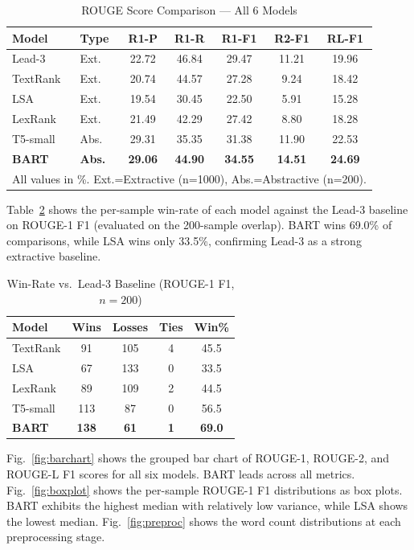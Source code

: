 \documentclass[conference]{IEEEtran}
\begin{document}
\begin{table}[h]
\caption{ROUGE Score Comparison --- All 6 Models}
\label{tab:rouge}
\centering
\setlength{\tabcolsep}{4pt}
\begin{tabular}{llccccc}
\toprule
\textbf{Model} & \textbf{Type} & \textbf{R1-P} & \textbf{R1-R} &
\textbf{R1-F1} & \textbf{R2-F1} & \textbf{RL-F1} \\
\midrule
Lead-3    & Ext. & 22.72 & 46.84 & 29.47 & 11.21 & 19.96 \\
TextRank  & Ext. & 20.74 & 44.57 & 27.28 &  9.24 & 18.42 \\
LSA       & Ext. & 19.54 & 30.45 & 22.50 &  5.91 & 15.28 \\
LexRank   & Ext. & 21.49 & 42.29 & 27.42 &  8.80 & 18.28 \\
T5-small  & Abs. & 29.31 & 35.35 & 31.38 & 11.90 & 22.53 \\
\textbf{BART} & \textbf{Abs.} & \textbf{29.06} & \textbf{44.90} &
\textbf{34.55} & \textbf{14.51} & \textbf{24.69} \\
\bottomrule
\multicolumn{7}{l}{\small All values in \%. Ext.=Extractive (n=1000),
Abs.=Abstractive (n=200).}
\end{tabular}
\end{table}

Table~\ref{tab:winrate} shows the per-sample win-rate of each model
against the Lead-3 baseline on ROUGE-1 F1 (evaluated on the 200-sample
overlap). BART wins 69.0\% of comparisons, while LSA wins only 33.5\%,
confirming Lead-3 as a strong extractive baseline.

\begin{table}[h]
\caption{Win-Rate vs.\ Lead-3 Baseline (ROUGE-1 F1, $n=200$)}
\label{tab:winrate}
\centering
\begin{tabular}{lcccc}
\toprule
\textbf{Model} & \textbf{Wins} & \textbf{Losses} & \textbf{Ties} &
\textbf{Win\%} \\
\midrule
TextRank  &  91 & 105 & 4 & 45.5 \\
LSA       &  67 & 133 & 0 & 33.5 \\
LexRank   &  89 & 109 & 2 & 44.5 \\
T5-small  & 113 &  87 & 0 & 56.5 \\
\textbf{BART} & \textbf{138} & \textbf{61} & \textbf{1} & \textbf{69.0} \\
\bottomrule
\end{tabular}
\end{table}

Fig.~\ref{fig:barchart} shows the grouped bar chart of ROUGE-1, ROUGE-2,
and ROUGE-L F1 scores for all six models. BART leads across all metrics.
Fig.~\ref{fig:boxplot} shows the per-sample ROUGE-1 F1 distributions as
box plots. BART exhibits the highest median with relatively low variance,
while LSA shows the lowest median. Fig.~\ref{fig:preproc} shows the word
count distributions at each preprocessing stage.
\end{document}
